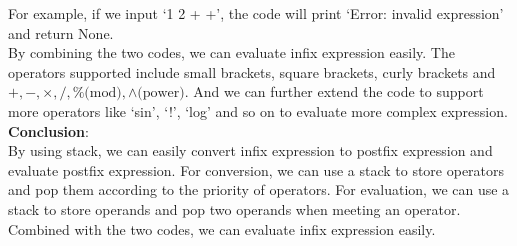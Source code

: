 \documentclass[UTF8]{ctexart}
\begin{document}
For example, if we input `1 2 + +', the code will print `Error: invalid expression' and return None.\\
By combining the two codes, we can evaluate infix expression easily. The operators supported include small brackets, square brackets, curly brackets 
and $+, -, \times, /, \% \text{(mod)},\wedge \text{(power)} $.
And we can further extend the code to support more operators like `sin', `!', `log' and so on to evaluate more complex expression.\\
\textbf{Conclusion}:\\
By using stack, we can easily convert infix expression to postfix expression and evaluate postfix expression. For conversion, we can use a stack to store operators and pop them according to the priority of operators.
For evaluation, we can use a stack to store operands and pop two operands when meeting an operator. Combined with the two codes, we can evaluate infix expression easily.\\
\end{document}
